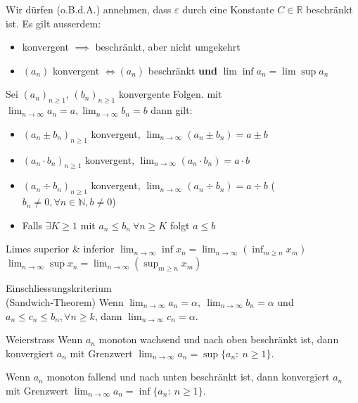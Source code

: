 \documentclass[a4paper,fontsize = 7pt]{scrartcl}
\def\limn{\lim_{n\to \infty}}
\def\R{\mathbb{R}}
\def\N{\mathbb{N}}
\begin{document}
Wir dürfen (o.B.d.A.) annehmen, dass $\varepsilon $ durch eine Konstante $C \in \R$ beschränkt ist.
Es gilt ausserdem:
\begin{itemize}
 \item konvergent $\implies$ beschränkt, aber nicht umgekehrt
 \item $(a_n)$ konvergent $\iff (a_n)$ beschränkt \textbf{und} $\lim \inf a_n = \lim \sup a_n$
\end{itemize}

Sei $(a_n)_{n \geq 1}$, $(b_n)_{n \geq 1}$ konvergente Folgen. mit \\$\limn a_n = a, \limn b_n = b$ dann gilt:
\begin{itemize}
  \item $(a_n \pm b_n)_{n \geq 1}$ konvergent, $\limn (a_n \pm b_n) = a \pm b$
  \item $(a_n \cdot b_n)_{n \geq 1}$ konvergent, $\limn (a_n \cdot b_n) = a \cdot b$
  \item $(a_n \div  b_n)_{n \geq 1}$ konvergent, $\limn (a_n \div b_n) = a \div b$ ($b_n \neq 0, \forall n \in \N, b \neq 0$)
  \item Falls $\exists K \geq 1$ mit $a_n \leq b_n ~ \forall n \geq K$ folgt $a \leq b$
\end{itemize}

\begin{subbox}{Limes superior \& inferior}
  \vspace{-4pt}
$\limn \inf x_n = \limn \left( \inf_{m \ge n} x_m \right)$ \\
$\limn \sup x_n = \limn \left( \sup_{m \ge n} x_m \right)$
  \vspace{-12pt}
\end{subbox}

\begin{mainbox}{Einschliessungskriterium \\ (Sandwich-Theorem)}
  \vspace{-4pt}
Wenn $\limn a_n = \alpha, \ \limn b_n = \alpha$ und $a_n \le c_n \le b_n, \forall n \ge k$, dann $\limn c_n = \alpha$.
  \vspace{-4pt}
\end{mainbox}

\begin{mainbox}{Weierstrass}
Wenn $a_n$ monoton wachsend und nach oben beschränkt ist, dann konvergiert $a_n$ mit Grenzwert $\limn a_n = \sup \{a_n : \ n \ge 1\}$.

Wenn $a_n$ monoton fallend und nach unten beschränkt ist, dann konvergiert $a_n$ mit Grenzwert $\limn a_n = \inf \{a_n : \ n \ge 1\}$.
\end{mainbox}
\end{document}
